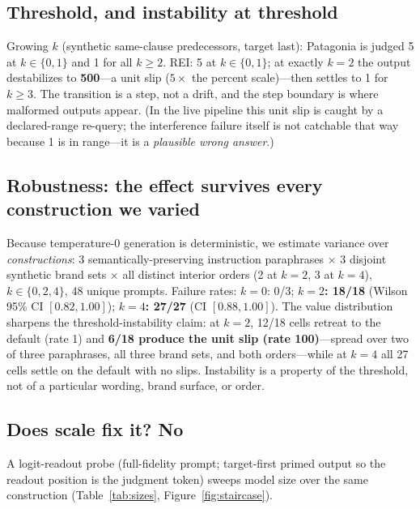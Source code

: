 \subsection{Threshold, and instability at threshold}
\label{sec:staircase}
Growing $k$ (synthetic same-clause predecessors, target last): Patagonia is judged 5 at $k \in \{0,1\}$ and 1
for all $k \ge 2$. REI: 5 at $k \in \{0,1\}$; at exactly $k{=}2$ the output destabilizes to \textbf{500}---a
unit slip ($5\times$ the percent scale)---then settles to 1 for $k \ge 3$. The transition is a step, not a
drift, and the step boundary is where malformed outputs appear. (In the live pipeline this unit slip is caught
by a declared-range re-query; the interference failure itself is not catchable that way because 1 is in
range---it is a \emph{plausible wrong answer}.)

\subsection{Robustness: the effect survives every construction we varied}
Because temperature-0 generation is deterministic, we estimate variance over \emph{constructions}: 3
semantically-preserving instruction paraphrases $\times$ 3 disjoint synthetic brand sets $\times$ all distinct
interior orders (2 at $k{=}2$, 3 at $k{=}4$), $k \in \{0,2,4\}$, 48 unique prompts. Failure rates: $k{=}0$:
0/3; \textbf{$k{=}2$: 18/18} (Wilson 95\% CI $[0.82, 1.00]$); \textbf{$k{=}4$: 27/27} (CI $[0.88, 1.00]$).
The value distribution sharpens the threshold-instability claim: at $k{=}2$, 12/18 cells retreat to the
default (rate 1) and \textbf{6/18 produce the unit slip (rate 100)}---spread over two of three paraphrases,
all three brand sets, and both orders---while at $k{=}4$ all 27 cells settle on the default with no slips.
Instability is a property of the threshold, not of a particular wording, brand surface, or order.

\subsection{Does scale fix it? No}
\label{sec:scale}
A logit-readout probe (full-fidelity prompt; target-first primed output so the readout position is the
judgment token) sweeps model size over the same construction (Table~\ref{tab:sizes},
Figure~\ref{fig:staircase}).

